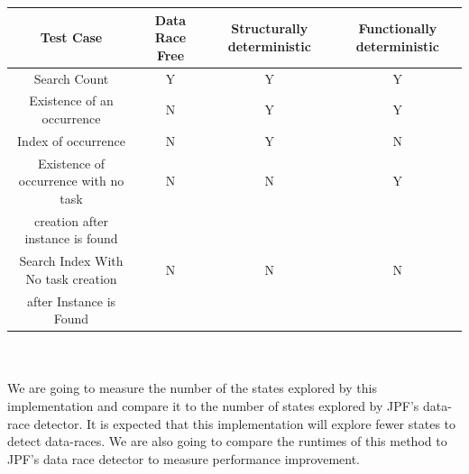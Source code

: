 \begin{tabular}{ | c | c | c | c |}
  \hline
  \textbf{Test Case} & \textbf{Data Race Free} & \textbf{Structurally deterministic} & \textbf{Functionally deterministic} \\
  \hline
  Search Count & Y & Y & Y \\
  \hline
  Existence of an occurrence & N & Y & Y \\
  \hline
  Index of occurrence & N & Y & N\\
  \hline
  Existence of occurrence with no task  & N & N & Y\\
  creation after instance is found & & & \\
  \hline
  Search Index With No task creation & N & N & N\\
   after Instance is Found  & & & \\
  \hline 
\end{tabular}
\\
\\
We are going to measure the number of the states explored by this implementation and compare it to the number of states explored by JPF's data-race detector. It is expected that this implementation will explore fewer states to detect data-races. We are also going to compare the runtimes of this method to JPF's data race detector to measure performance improvement.
